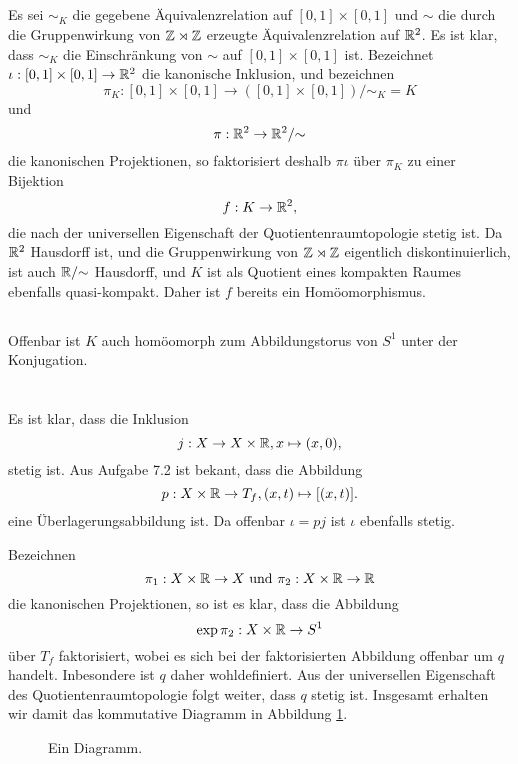 \documentclass[a4paper,10pt]{article}
\begin{document}
\subsection{}
Es sei $\sim_K$ die gegebene Äquivalenzrelation auf $[0,1] \times [0,1]$ und $\sim$ die durch die Gruppenwirkung von $\mathbb{Z} \rtimes \mathbb{Z}$ erzeugte Äquivalenzrelation auf $\mathbb{R}^2$. Es ist klar, dass $\sim_K$ die Einschränkung von $\sim$ auf $[0,1] \times [0,1]$ ist. Bezeichnet $\iota : [0,1] \times [0,1] \to \mathbb{R}^2$ die kanonische Inklusion, und bezeichnen
\[
 \pi_K : [0,1] \times [0,1] \to ([0,1] \times [0,1])/{\sim_K} = K
\]
und
\[
 \pi : \mathbb{R}^2 \to \mathbb{R}^2 / {\sim}
\]
die kanonischen Projektionen, so faktorisiert deshalb $\pi \iota$ über $\pi_K$ zu einer Bijektion
\[
 f : K \to \mathbb{R}^2,
\]
die nach der universellen Eigenschaft der Quotientenraumtopologie stetig ist. Da $\mathbb{R}^2$ Hausdorff ist, und die Gruppenwirkung von $\mathbb{Z} \rtimes \mathbb{Z}$ eigentlich diskontinuierlich, ist auch $\mathbb{R}/{\sim}$ Hausdorff, und $K$ ist als Quotient eines kompakten Raumes ebenfalls quasi-kompakt. Daher ist $f$ bereits ein Homöomorphismus.


\subsection{}
Offenbar ist $K$ auch homöomorph zum Abbildungstorus von $S^1$ unter der Konjugation. 







\section{}
Es ist klar, dass die Inklusion
\[
 j : X \to X \times \mathbb{R}, x \mapsto (x,0),
\]
stetig ist. Aus Aufgabe 7.2 ist bekant, dass die Abbildung
\[
 p : X \times \mathbb{R} \to T_f, (x,t) \mapsto [(x,t)].
\]
eine Überlagerungsabbildung ist. Da offenbar $\iota = pj$ ist $\iota$ ebenfalls stetig.

Bezeichnen
\[
 \pi_1 : X \times \mathbb{R} \to X \text{ und } \pi_2 : X \times \mathbb{R} \to \mathbb{R}
\]
die kanonischen Projektionen, so ist es klar, dass die Abbildung
\[
 \exp \pi_2 : X \times \mathbb{R} \to S^1
\]
über $T_f$ faktorisiert, wobei es sich bei der faktorisierten Abbildung offenbar um $q$ handelt. Inbesondere ist $q$ daher wohldefiniert. Aus der universellen Eigenschaft des Quotientenraumtopologie folgt weiter, dass $q$ stetig ist. Insgesamt erhalten wir damit das kommutative Diagramm in Abbildung \ref{fig: großes Diagramm}.
\begin{figure}\centering
 \caption{Ein Diagramm.}
 \label{fig: großes Diagramm}
\end{figure}
\end{document}
